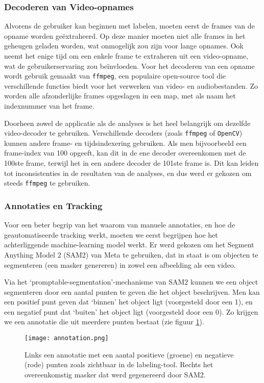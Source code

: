 \subsubsection{Decoderen van Video-opnames}

Alvorens de gebruiker kan beginnen met labelen, moeten eerst de frames van de opname worden geëxtraheerd.
Op deze manier moeten niet alle frames in het geheugen geladen worden, wat onmogelijk zou zijn voor lange opnames.
Ook neemt het enige tijd om een enkele frame te extraheren uit een video-opname, wat de gebruikerservaring zou beïnvloeden.
Voor het decoderen van een opname wordt gebruik gemaakt van \texttt{ffmpeg}, een populaire open-source tool die verschillende 
functies biedt voor het verwerken van video- en audiobestanden.
Zo worden alle afzonderlijke frames opgeslagen in een map, met als naam het indexnummer van het frame.

Doorheen zowel de applicatie als de analyses is het heel belangrijk om dezelfde video-decoder te gebruiken.
Verschillende decoders (zoals \texttt{ffmpeg} of \texttt{OpenCV}) kunnen andere frame- en tijdsindexering gebruiken.
Als men bijvoorbeeld een frame-index van 100 opgeeft, kan dit in de ene decoder overeenkomen met de 100ste frame, terwijl het in een andere decoder de 101ste frame is.
Dit kan leiden tot inconsistenties in de resultaten van de analyses, en dus werd er gekozen om steeds \texttt{ffmpeg} te gebruiken.

\subsubsection{Annotaties en Tracking}

Voor een beter begrip van het waarom van manuele annotaties, en hoe de geautomatiseerde tracking werkt, moeten we eerst begrijpen hoe het achterliggende machine-learning model werkt.
Er werd gekozen om het Segment Anything Model 2 (SAM2) van Meta te gebruiken, dat in staat is om objecten te segmenteren (een masker genereren) in zowel een afbeelding als een video.

Via het `promptable-segmentation'-mechanisme van SAM2 kunnen we een object segmenteren door een aantal punten te geven die het object beschrijven.
Men kan een positief punt geven dat `binnen' het object ligt (voorgesteld door een 1), en een negatief punt dat `buiten' het object ligt (voorgesteld door een 0).
Zo krijgen we een annotatie die uit meerdere punten bestaat (zie figuur \ref{fig:annotation}).

\begin{figure}[H]
  \centering
  \texttt{[image: annotation.png]}
  \caption[
Voorbeeld van een annotatie in de labeling-tool met SAM2
  ]{\label{fig:annotation} Links een annotatie met een aantal positieve (groene) en negatieve (rode) punten zoals zichtbaar in de labeling-tool. Rechts het overeenkomstig masker dat werd gegenereerd door SAM2. }
\end{figure}

